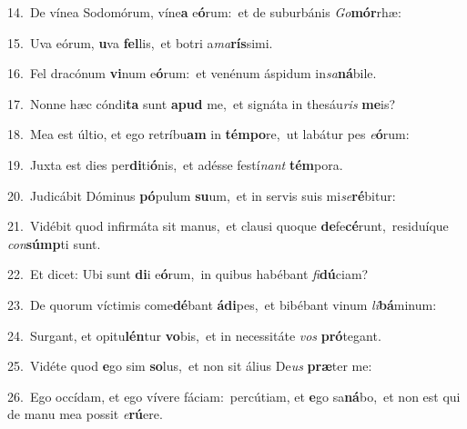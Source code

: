 {\numbfont\textcolor{\numbcolor}{14.}}~De vínea Sodomórum, víne\textbf{a} e\-\textbf{ó}\-rum:~\star et de suburbánis \textit{Go}\-\textbf{mór}rhæ:\par
{\numbfont\textcolor{\numbcolor}{15.}}~Uva eórum, \textbf{u}\-va \textbf{fel}\-lis,~\star et botri a\-\textit{ma}\-\textbf{rís}simi.\par
{\numbfont\textcolor{\numbcolor}{16.}}~Fel dracónum \textbf{vi}\-num e\-\textbf{ó}\-rum:~\star et venénum áspidum in\-\textit{sa}\-\textbf{ná}bile.\par
{\numbfont\textcolor{\numbcolor}{17.}}~Nonne hæc cóndi\textbf{ta} sunt \textbf{a}\-\textbf{pud} me,~\star et signáta in thesáu\textit{ris} \textbf{me}\-is?\par
{\numbfont\textcolor{\numbcolor}{18.}}~Mea est últio, et ego retríbu\textbf{am} in \textbf{tém}\-\textbf{po}re,~\star ut labátur pes \textit{e}\-\textbf{ó}rum:\par
{\numbfont\textcolor{\numbcolor}{19.}}~Juxta est dies per\-\textbf{di}\-ti\-\textbf{ó}\-nis,~\star et adésse festí\textit{nant} \textbf{tém}\-pora.\par
{\numbfont\textcolor{\numbcolor}{20.}}~Judicábit Dóminus \textbf{pó}\-pulum \textbf{su}\-um,~\star et in servis suis mi\-\textit{se}\-\textbf{ré}bitur:\par
{\numbfont\textcolor{\numbcolor}{21.}}~Vidébit quod infirmáta sit manus,~\dagger et clausi quoque \textbf{de}\-fe\-\textbf{cé}\-runt,~\star residuíque \textit{con}\-\textbf{súmp}ti sunt.\par
{\numbfont\textcolor{\numbcolor}{22.}}~Et dicet: Ubi sunt \textbf{di}\-i e\-\textbf{ó}\-rum,~\star in quibus habébant \textit{fi}\-\textbf{dú}ciam?\par
{\numbfont\textcolor{\numbcolor}{23.}}~De quorum víctimis come\-\textbf{dé}\-bant \textbf{á}\-\textbf{di}pes,~\star et bibébant vinum \textit{li}\-\textbf{bá}minum:\par
{\numbfont\textcolor{\numbcolor}{24.}}~Surgant, et opitu\-\textbf{lén}\-tur \textbf{vo}\-bis,~\star et in necessitáte \textit{vos} \textbf{pró}\-tegant.\par
{\numbfont\textcolor{\numbcolor}{25.}}~Vidéte quod \textbf{e}\-go sim \textbf{so}\-lus,~\star et non sit álius De\textit{us} \textbf{præ}\-ter me:\par
{\numbfont\textcolor{\numbcolor}{26.}}~Ego occídam, et ego vívere fáciam:~\dagger percútiam, et \textbf{e}\-go sa\-\textbf{ná}\-bo,~\star et non est qui de manu mea possit \textit{e}\-\textbf{rú}ere.\par
